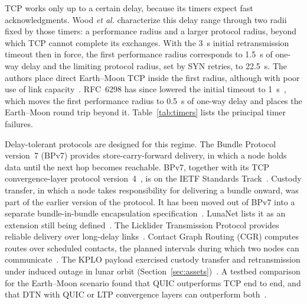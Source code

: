 \documentclass{IEEEoj}
\begin{document}
TCP works only up to a certain delay, because its timers expect fast acknowledgments. Wood \emph{et al.} characterize this delay range through two radii fixed by those timers: a performance radius and a larger protocol radius, beyond which TCP cannot complete its exchanges. With the \SI{3}{\second} initial retransmission timeout then in force, the first performance radius corresponds to \SI{1.5}{\second} of one-way delay and the limiting protocol radius, set by SYN retries, to \SI{22.5}{\second}. The authors place direct Earth--Moon TCP inside the first radius, although with poor use of link capacity~\cite{wood_tcp_radius}. RFC~6298 has since lowered the initial timeout to \SI{1}{\second}~\cite{rfc6298}, which moves the first performance radius to \SI{0.5}{\second} of one-way delay and places the Earth--Moon round trip beyond it. Table~\ref{tab:timers} lists the principal timer failures.

Delay-tolerant protocols are designed for this regime. The Bundle Protocol version~7 (BPv7) provides store-carry-forward delivery, in which a node holds data until the next hop becomes reachable. BPv7, together with its TCP convergence-layer protocol version~4~\cite{rfc9174}, is on the IETF Standards Track~\cite{rfc9171}. Custody transfer, in which a node takes responsibility for delivering a bundle onward, was part of the earlier version of the protocol. It has been moved out of BPv7 into a separate bundle-in-bundle encapsulation specification~\cite{rfc9171}. LunaNet lists it as an extension still being defined~\cite{lnis_v5}. The Licklider Transmission Protocol provides reliable delivery over long-delay links~\cite{rfc5326}. Contact Graph Routing (CGR) computes routes over scheduled contacts, the planned intervals during which two nodes can communicate~\cite{burleigh_cgr}. The KPLO payload exercised custody transfer and retransmission under induced outage in lunar orbit (Section~\ref{sec:assets})~\cite{kim_kplo_dtn}. A testbed comparison for the Earth--Moon scenario found that QUIC outperforms TCP end to end, and that DTN with QUIC or LTP convergence layers can outperform both~\cite{e2e_vs_dtn_2026}.
\end{document}
